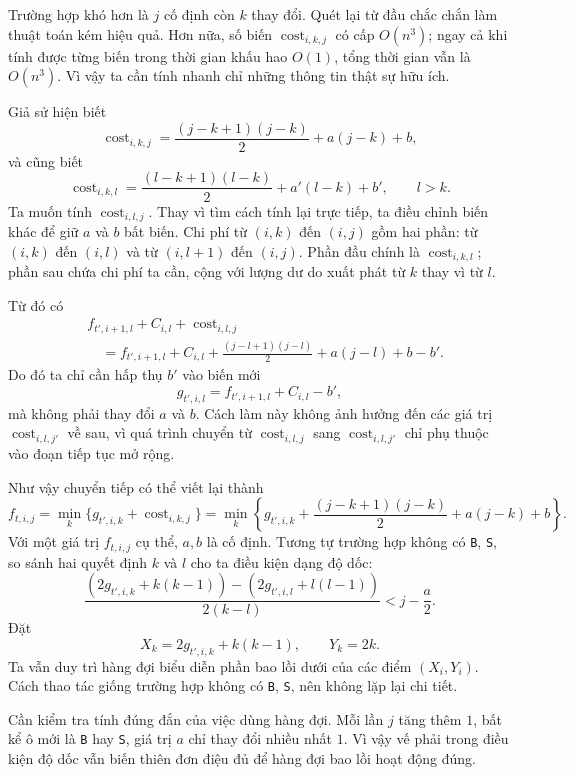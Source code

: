 \documentclass[11pt]{article}
\begin{document}
Trường hợp khó hơn là $j$ cố định còn $k$ thay đổi. Quét lại từ đầu chắc chắn
làm thuật toán kém hiệu quả. Hơn nữa, số biến
$\operatorname{cost}_{i,k,j}$ có cấp $O(n^3)$; ngay cả khi tính được từng biến
trong thời gian khấu hao $O(1)$, tổng thời gian vẫn là $O(n^3)$. Vì vậy ta cần
tính nhanh chỉ những thông tin thật sự hữu ích.

Giả sử hiện biết
\[
  \operatorname{cost}_{i,k,j}
  =
  \frac{(j-k+1)(j-k)}{2}+a(j-k)+b,
\]
và cũng biết
\[
  \operatorname{cost}_{i,k,l}
  =
  \frac{(l-k+1)(l-k)}{2}+a'(l-k)+b',
  \qquad l>k.
\]
Ta muốn tính $\operatorname{cost}_{i,l,j}$. Thay vì tìm cách tính lại trực
tiếp, ta điều chỉnh biến khác để giữ $a$ và $b$ bất biến. Chi phí từ
$(i,k)$ đến $(i,j)$ gồm hai phần: từ $(i,k)$ đến $(i,l)$ và từ $(i,l+1)$ đến
$(i,j)$. Phần đầu chính là $\operatorname{cost}_{i,k,l}$; phần sau chứa chi
phí ta cần, cộng với lượng dư do xuất phát từ $k$ thay vì từ $l$.

Từ đó có
\[
\begin{aligned}
&f_{t',i+1,l}+C_{i,l}+\operatorname{cost}_{i,l,j}\\
&\quad =
f_{t',i+1,l}+C_{i,l}
+\frac{(j-l+1)(j-l)}{2}+a(j-l)+b-b'.
\end{aligned}
\]
Do đó ta chỉ cần hấp thụ $b'$ vào biến mới
\[
  g_{t',i,l}=f_{t',i+1,l}+C_{i,l}-b',
\]
mà không phải thay đổi $a$ và $b$. Cách làm này không ảnh hưởng đến các giá
trị $\operatorname{cost}_{i,l,j'}$ về sau, vì quá trình chuyển từ
$\operatorname{cost}_{i,l,j}$ sang $\operatorname{cost}_{i,l,j'}$ chỉ phụ
thuộc vào đoạn tiếp tục mở rộng.

Như vậy chuyển tiếp có thể viết lại thành
\[
  f_{t,i,j}
  =
  \min_k\{g_{t',i,k}+\operatorname{cost}_{i,k,j}\}
  =
  \min_k\left\{
    g_{t',i,k}
    +\frac{(j-k+1)(j-k)}{2}
    +a(j-k)+b
  \right\}.
\]
Với một giá trị $f_{t,i,j}$ cụ thể, $a,b$ là cố định. Tương tự trường hợp
không có \texttt{B}, \texttt{S}, so sánh hai quyết định $k$ và $l$ cho ta điều
kiện dạng độ dốc:
\[
  \frac{(2g_{t',i,k}+k(k-1))-(2g_{t',i,l}+l(l-1))}{2(k-l)}
  < j-\frac{a}{2}.
\]
Đặt
\[
  X_k=2g_{t',i,k}+k(k-1),\qquad Y_k=2k.
\]
Ta vẫn duy trì hàng đợi biểu diễn phần bao lồi dưới của các điểm
$(X_i,Y_i)$. Cách thao tác giống trường hợp không có \texttt{B}, \texttt{S},
nên không lặp lại chi tiết.

Cần kiểm tra tính đúng đắn của việc dùng hàng đợi. Mỗi lần $j$ tăng thêm $1$,
bất kể ô mới là \texttt{B} hay \texttt{S}, giá trị $a$ chỉ thay đổi nhiều nhất
$1$. Vì vậy vế phải trong điều kiện độ dốc vẫn biến thiên đơn điệu đủ để hàng
đợi bao lồi hoạt động đúng.
\end{document}
